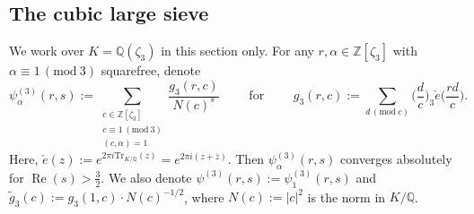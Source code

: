 \documentclass[12pt,reqno]{amsart}
\numberwithin{equation}{section}
\renewcommand{\Re}{\operatorname{Re}}
\renewcommand{\pmod}[1]{\, (\mathrm{mod}\ #1)}
\newcommand{\Z}{\mathbb{Z}}
\newcommand{\Q}{\mathbb{Q}}
\begin{document}
\subsection{The cubic large sieve}
We work over $K = \Q(\zeta_3)$ in this section only. For any $r, \alpha \in \Z[\zeta_3]$ with $\alpha\equiv 1 \pmod{3}$ squarefree, denote
\begin{equation} \label{psizetadef}
    \psi^{(3)}_\alpha(r, s) := \sum_{\substack{c \in \Z[\zeta_3] \\ c\equiv 1 \pmod{3} \\ (c, \alpha)=1}} \frac{g_3(r, c)}{N(c)^s} \qquad \text{ for } \qquad g_3(r,c):=\sum_{d \pmod{c}} \Big(\frac{d}{c}\Big)_3 \check{e} \Big( \frac{r d}{c} \Big).
\end{equation}
Here, $\check{e}(z):=e^{2 \pi i \text{Tr}_{K/\Q}(z)}=e^{2 \pi i(z+\overline{z})}$. Then $\psi^{(3)}_\alpha(r, s)$ converges absolutely for $\Re(s) > \frac{3}{2}$. We also denote $\psi^{(3)}(r, s) := \psi^{(3)}_1(r, s)$ and $\widetilde{g}_3(c) := g_3(1, c) \cdot N(c)^{-1/2}$, where $N(c) := |{c}|^2$ is the norm in $K/\Q$. 
\end{document}
